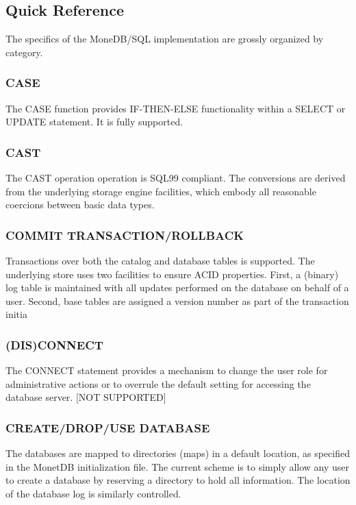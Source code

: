\documentclass[10pt,twocolumn,fleqn]{article}
\begin{document}
\subsection{Quick Reference}
The specifics of the MoneDB/SQL implementation are grossly organized
by category.

\subsubsection*{CASE}
The CASE function provides IF-THEN-ELSE functionality within
a SELECT or UPDATE statement. It is fully supported.

\subsubsection*{CAST}
The CAST operation  operation is SQL99 compliant.
The conversions are derived from the underlying storage engine facilities,
which embody all reasonable coercions between basic data types.

\subsubsection*{COMMIT TRANSACTION/ROLLBACK }
Transactions over both the catalog and database tables is supported.
The underlying store uses two facilities to ensure ACID properties.
First, a (binary) log table is maintained with all updates performed
on the database on behalf of a user. Second, base tables are assigned
a version number as part of the transaction initia

\subsubsection*{(DIS)CONNECT }

The CONNECT statement provides a mechanism to change the user role
for administrative actions or to overrule the default setting for
accessing the database server. [NOT SUPPORTED]

\subsubsection*{CREATE/DROP/USE DATABASE}
The databases are mapped to directories (maps) in a default location, as 
specified in the MonetDB initialization file. The current scheme is 
to simply allow any user to create a database by reserving a
directory to hold all information. The location of the database
log is similarly controlled.
\end{document}

